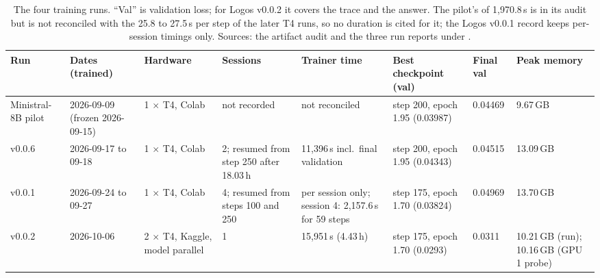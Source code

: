 \begin{table}[t]
\centering\scriptsize
\caption{The four training runs. ``Val'' is validation loss; for Logos v0.0.2 it covers the trace and the answer. The pilot's  of 1,970.8\,s is in its audit but is not reconciled with the 25.8 to 27.5\,s per step of the later T4 runs, so no duration is cited for it; the Logos v0.0.1 record keeps per-session timings only. Sources: the artifact audit and the three run reports under .}
\label{tab:runs}
\begin{tabular}{L{20mm}L{21mm}L{18mm}L{22mm}L{21mm}L{20mm}L{13mm}L{13mm}}
\toprule
Run & Dates (trained) & Hardware & Sessions & Trainer time & Best checkpoint (val) & Final val & Peak memory \\
\midrule
Ministral-8B pilot & 2026-09-09 (frozen 2026-09-15) & 1 $\times$ T4, Colab & not recorded & not reconciled & step 200, epoch 1.95 (0.03987) & 0.04469 & 9.67\,GB \\
\hermes{} v0.0.6 & 2026-09-17 to 09-18 & 1 $\times$ T4, Colab & 2; resumed from step 250 after 18.03\,h & 11,396\,s incl.\ final validation & step 200, epoch 1.95 (0.04343) & 0.04515 & 13.09\,GB \\
\logos{} v0.0.1 & 2026-09-24 to 09-27 & 1 $\times$ T4, Colab & 4; resumed from steps 100 and 250 & per session only; session 4: 2,157.6\,s for 59 steps & step 175, epoch 1.70 (0.03824) & 0.04969 & 13.70\,GB \\
\logos{} v0.0.2 & 2026-10-06 & 2 $\times$ T4, Kaggle, model parallel & 1 & 15,951\,s (4.43\,h) & step 175, epoch 1.70 (0.0293) & 0.0311 & 10.21\,GB (run); 10.16\,GB (GPU 1 probe) \\
\bottomrule
\end{tabular}
\end{table}



